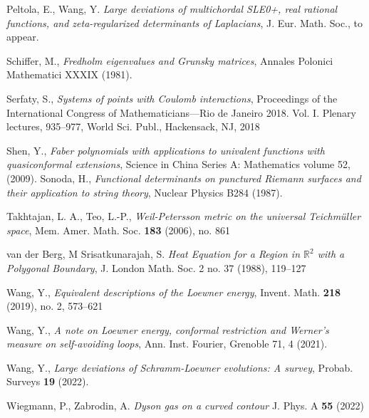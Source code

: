 \documentclass{article}
\numberwithin{equation}{section}
\numberwithin{figure}{section}
\theoremstyle{plain}
\theoremstyle{plain}
\numberwithin{thm}{section}
\theoremstyle{remark}
\newcommand{\R}{\mathbb{R}}
\begin{document}
\begin{thebibliography}{99}
 Peltola, E., Wang, Y. \emph{Large deviations of multichordal SLE0+, real rational functions, and zeta-regularized determinants of Laplacians}, J. Eur. Math. Soc., to appear.

 Schiffer, M., \emph{Fredholm eigenvalues and Grunsky matrices}, Annales Polonici Mathematici XXXIX (1981).

 Serfaty, S., \emph{Systems of points with Coulomb interactions}, Proceedings of the International Congress of Mathematicians—Rio de Janeiro 2018. Vol. I. Plenary lectures, 935--977, World Sci. Publ., Hackensack, NJ, 2018

 Shen, Y., \emph{Faber polynomials with applications to univalent functions with quasiconformal extensions}, Science in China Series A: Mathematics volume 52, (2009).
 Sonoda, H., \emph{Functional determinants on punctured {R}iemann surfaces and their application to string theory}, Nuclear Physics B284 (1987).

 Takhtajan, L. A., Teo, L.-P., \emph{Weil-Petersson metric on the universal Teichm\"uller space}, Mem. Amer. Math. Soc. {\bf 183} (2006), no. 861

 van der Berg, M Srisatkunarajah, S. \emph{Heat Equation for a Region in $\R^2$ with a Polygonal Boundary}, J. London Math. Soc. 2 no. 37 (1988), 119--127


 Wang, Y., \emph{Equivalent descriptions of the Loewner energy}, Invent. Math. {\bf 218} (2019), no. 2, 573--621

 Wang, Y., \emph{A note on Loewner energy, conformal restriction and Werner's measure on self-avoiding loops}, Ann. Inst. Fourier, Grenoble
71, 4 (2021).

 Wang, Y., \emph{Large deviations of Schramm-Loewner evolutions: A survey}, Probab. Surveys {\bf 19} (2022). 

 Wiegmann, P., Zabrodin, A. \emph{Dyson gas on a curved contour} J. Phys. A {\bf 55} (2022)

\end{thebibliography}
\end{document}

